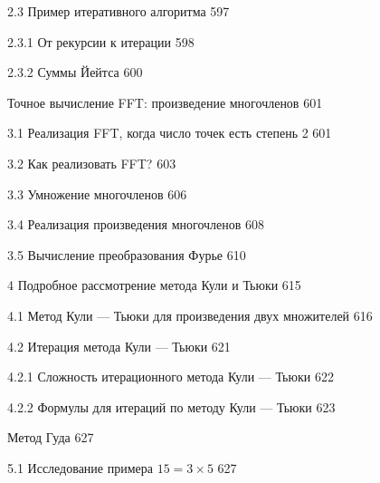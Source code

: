 \documentclass{mai_book}
\begin{document}
{2.3 Пример итеративного алгоритма \dotfill \hspace{0.5cm} 597

\hspace{0.5cm}2.3.1 От рекурсии к итерации\dotfill \hspace{0.5cm} 598

\hspace{0.5cm}2.3.2 Суммы Йейтса \dotfill \hspace{0.5cm} 600

 \hspace{0.05cm} Точное вычисление FFT: произведение многочленов \dotfill \hspace{0.5cm} 601

3.1 Реализация FFT, когда число точек есть степень 2\dotfill \hspace{0.5cm} 601

3.2 Как реализовать FFT? \dotfill \hspace{0.5cm} 603

3.3 Умножение многочленов \dotfill \hspace{0.5cm} 606

3.4 Реализация произведения многочленов \dotfill \hspace{0.5cm} 608

3.5 Вычисление преобразования Фурье \dotfill \hspace{0.5cm} 610

4 Подробное рассмотрение метода Кули и Тьюки\dotfill \hspace{0.5cm} 615 

4.1 Метод Кули — Тьюки для произведения двух множителей \dotfill \hspace{0.5cm} 616 

4.2 Итерация метода Кули — Тьюки \dotfill \hspace{0.5cm} 621

4.2.1 Сложность итерационного метода Кули — Тьюки \dotfill \hspace{0.5cm} 622

4.2.2 Формулы для итераций по методу Кули — Тьюки \dotfill \hspace{0.5cm} 623
 
 \hspace{0.05cm} Метод Гуда \dotfill \hspace{0.5cm} 627

5.1 Исследование примера $15 = 3 \times 5$ \dotfill \hspace{0.5cm} 627

}
\end{document}
